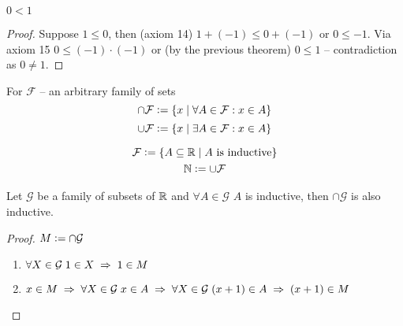 \begin{theorem} $0 < 1$ \end{theorem}
\begin{proof}
    Suppose $1 \le 0$, then (axiom 14) $1 + (-1) \le 0 + (-1)$ or $0 \le -1$. Via axiom 15 $0 \le (-1) \cdot (-1)$ or (by the previous theorem) $0 \le 1$ -- contradiction as $0 \ne 1$.
\end{proof}

For $\mathcal{F}$ -- an arbitrary family of sets
\begin{equation}
    \cap \mathcal{F} \vcentcolon= \{ x \;\vert\; \forall A \in \mathcal{F} : x \in A\}
\end{equation}
\begin{equation}
    \cup \mathcal{F} \vcentcolon= \{ x \;\vert\; \exists A \in \mathcal{F} : x \in A\}
\end{equation}


\begin{equation}
\begin{gathered}
    \mathcal{F} \vcentcolon= \{ A \subseteq \mathbb{R} \;\vert\; A \text{ is inductive} \} \\    
    \mathbb{N} \vcentcolon= \cup \mathcal{F}
\end{gathered}
\end{equation}

\begin{theorem}
    \label{inductivesubset}
    Let $\mathcal{G}$ be a family of subsets of $\mathbb{R}$ and $\forall A \in \mathcal{G}$ $A$ is inductive, then $\cap \mathcal{G}$ is also inductive.
\end{theorem}
\begin{proof}
    $M \vcentcolon= \cap \mathcal{G}$
    \begin{enumerate}
        \item $\forall X \in \mathcal{G} \; 1 \in X \thus 1 \in M$
        \item $x \in M \thus \forall X \in \mathcal{G} \; x \in A \thus \forall X \in \mathcal{G} \; (x + 1) \in A \thus (x + 1) \in M$
    \end{enumerate}
\end{proof}

